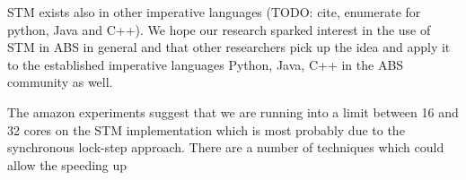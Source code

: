 STM exists also in other imperative languages (TODO: cite, enumerate for python, Java and C++). We hope our research sparked interest in the use of STM in ABS in general and that other researchers pick up the idea and apply it to the established imperative languages Python, Java, C++ in the ABS community as well. 

The amazon experiments suggest that we are running into a limit between 16 and 32 cores on the STM implementation which is most probably due to the synchronous lock-step approach. There are a number of techniques which could allow the speeding up 